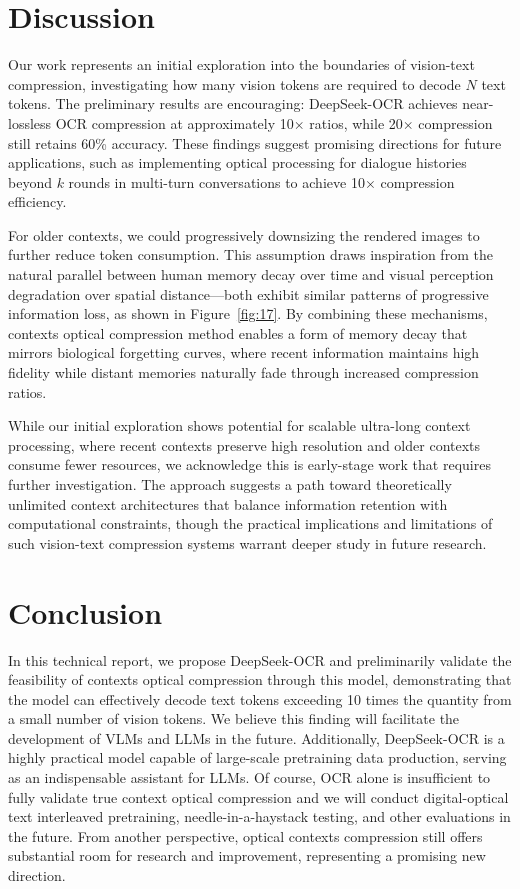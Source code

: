 \documentclass[11pt, a4paper, logo, copyright, nonumbering]{deepseek}
\begin{document}
\begin{CJK*}{UTF8}{gbsn}
\section{Discussion}
Our work represents an initial exploration into the boundaries of vision-text compression, investigating how many vision tokens are required to decode $N$ text tokens. The preliminary results are encouraging: DeepSeek-OCR achieves near-lossless OCR compression at approximately 10$\times$ ratios, while 20$\times$ compression still retains 60\% accuracy. These findings suggest promising directions for future applications, such as implementing optical processing for dialogue histories beyond $k$ rounds in multi-turn conversations to achieve 10$\times$ compression efficiency.

For older contexts, we could progressively downsizing the rendered images to further reduce token consumption. This assumption draws inspiration from the natural parallel between human memory decay over time and visual perception degradation over spatial distance—both exhibit similar patterns of progressive information loss, as shown in Figure~\ref{fig:17}. By combining these mechanisms, contexts optical compression method enables a form of memory decay that mirrors biological forgetting curves, where recent information maintains high fidelity while distant memories naturally fade through increased compression ratios.

While our initial exploration shows potential for scalable ultra-long context processing, where recent contexts preserve high resolution and older contexts consume fewer resources, we acknowledge this is early-stage work that requires further investigation. The approach suggests a path toward theoretically unlimited context architectures that balance information retention with computational constraints, though the practical implications and limitations of such vision-text compression systems warrant deeper study in future research.

\section{Conclusion}
In this technical report, we propose DeepSeek-OCR and preliminarily validate the feasibility of contexts optical compression through this model, demonstrating that the model can effectively decode text tokens exceeding 10 times the quantity from a small number of vision tokens. We believe this finding will facilitate the development of VLMs and LLMs in the future. Additionally, DeepSeek-OCR is a highly practical model capable of large-scale pretraining data production, serving as an indispensable assistant for LLMs. Of course, OCR alone is insufficient to fully validate true context optical compression and we will conduct digital-optical text interleaved pretraining, needle-in-a-haystack testing, and other evaluations in the future. From another perspective, optical contexts compression still offers substantial room for research and improvement, representing a promising new direction.


\newpage


% 





\end{CJK*}
\end{document}
